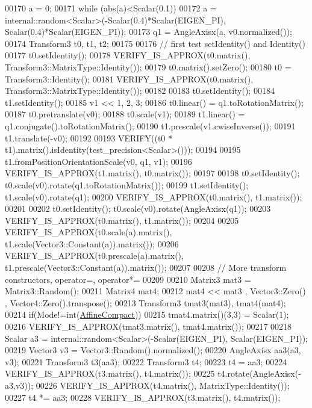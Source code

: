 \begin{DoxyCode}
00170   a = 0;
00171   \textcolor{keywordflow}{while} (abs(a)<Scalar(0.1))
00172     a = internal::random<Scalar>(-Scalar(0.4)*Scalar(EIGEN\_PI), Scalar(0.4)*Scalar(EIGEN\_PI));
00173   q1 = AngleAxisx(a, v0.normalized());
00174   Transform3 t0, t1, t2;
00175 
00176   \textcolor{comment}{// first test setIdentity() and Identity()}
00177   t0.setIdentity();
00178   VERIFY\_IS\_APPROX(t0.matrix(), Transform3::MatrixType::Identity());
00179   t0.matrix().setZero();
00180   t0 = Transform3::Identity();
00181   VERIFY\_IS\_APPROX(t0.matrix(), Transform3::MatrixType::Identity());
00182 
00183   t0.setIdentity();
00184   t1.setIdentity();
00185   v1 << 1, 2, 3;
00186   t0.linear() = q1.toRotationMatrix();
00187   t0.pretranslate(v0);
00188   t0.scale(v1);
00189   t1.linear() = q1.conjugate().toRotationMatrix();
00190   t1.prescale(v1.cwiseInverse());
00191   t1.translate(-v0);
00192 
00193   VERIFY((t0 * t1).matrix().isIdentity(test\_precision<Scalar>()));
00194 
00195   t1.fromPositionOrientationScale(v0, q1, v1);
00196   VERIFY\_IS\_APPROX(t1.matrix(), t0.matrix());
00197 
00198   t0.setIdentity(); t0.scale(v0).rotate(q1.toRotationMatrix());
00199   t1.setIdentity(); t1.scale(v0).rotate(q1);
00200   VERIFY\_IS\_APPROX(t0.matrix(), t1.matrix());
00201 
00202   t0.setIdentity(); t0.scale(v0).rotate(AngleAxisx(q1));
00203   VERIFY\_IS\_APPROX(t0.matrix(), t1.matrix());
00204 
00205   VERIFY\_IS\_APPROX(t0.scale(a).matrix(), t1.scale(Vector3::Constant(a)).matrix());
00206   VERIFY\_IS\_APPROX(t0.prescale(a).matrix(), t1.prescale(Vector3::Constant(a)).matrix());
00207 
00208   \textcolor{comment}{// More transform constructors, operator=, operator*=}
00209 
00210   Matrix3 mat3 = Matrix3::Random();
00211   Matrix4 mat4;
00212   mat4 << mat3 , Vector3::Zero() , Vector4::Zero().transpose();
00213   Transform3 tmat3(mat3), tmat4(mat4);
00214   \textcolor{keywordflow}{if}(Mode!=\textcolor{keywordtype}{int}(\hyperlink{group__enums_ggaee59a86102f150923b0cac6d4ff05107aa30a06b60d218b709020972df47de2b0}{AffineCompact}))
00215     tmat4.matrix()(3,3) = Scalar(1);
00216   VERIFY\_IS\_APPROX(tmat3.matrix(), tmat4.matrix());
00217 
00218   Scalar a3 = internal::random<Scalar>(-Scalar(EIGEN\_PI), Scalar(EIGEN\_PI));
00219   Vector3 v3 = Vector3::Random().normalized();
00220   AngleAxisx aa3(a3, v3);
00221   Transform3 t3(aa3);
00222   Transform3 t4;
00223   t4 = aa3;
00224   VERIFY\_IS\_APPROX(t3.matrix(), t4.matrix());
00225   t4.rotate(AngleAxisx(-a3,v3));
00226   VERIFY\_IS\_APPROX(t4.matrix(), MatrixType::Identity());
00227   t4 *= aa3;
00228   VERIFY\_IS\_APPROX(t3.matrix(), t4.matrix());

\end{DoxyCode}
